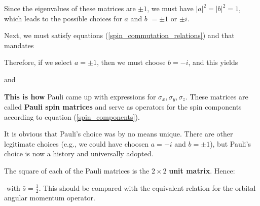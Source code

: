 \documentclass{article}
\begin{document}
Since the eigenvalues of these matrices are $\pm 1$, we must have $|a|^2 = |b|^2 = 1$, which leads to the possible choices for $a$ and $b$ $=\pm 1$ or $\pm i$.

Next, we must satisfy equations (\ref{spin_commutation_relations}) and that mandates


Therefore, if we select $a = \pm 1$, then we must choose $b = -i$, and this yields


and 


\textbf{This is how} Pauli came up with expressions for $\sigma_x, \sigma_y, \sigma_z$. These matrices are called \textbf{Pauli spin matrices} and serve as operators for the spin components according to equation (\ref{spin_components}).

It is obvious that Pauli's choice was by no means unique. There are other legitimate choices (e.g., we could have choosen $a=-i$ and $b=\pm 1$), but Pauli's choice is now a history and universally adopted.




The square of each of the Pauli matrices is the $2\times 2$ \textbf{unit matrix}. Hence:


-with $\bar{s} = \frac{1}{2}$. This should be compared with the equivalent relation for the orbital angular momentum operator.
\end{document}
